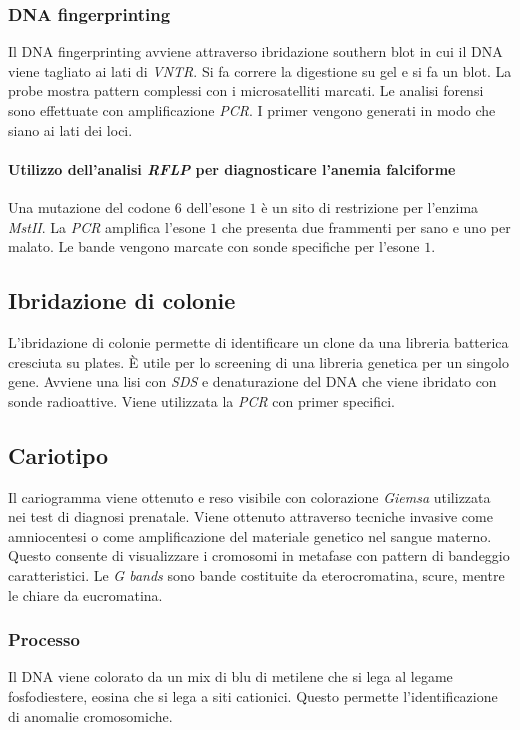 		\subsubsection{DNA fingerprinting}
		Il DNA fingerprinting avviene attraverso ibridazione southern blot in cui il DNA viene tagliato ai lati di \emph{VNTR}.
		Si fa correre la digestione su gel e si fa un blot.
		La probe mostra pattern complessi con i microsatelliti marcati.
		Le analisi forensi sono effettuate con amplificazione \emph{PCR}.
		I primer vengono generati in modo che siano ai lati dei loci.

			\paragraph{Utilizzo dell'analisi \emph{RFLP} per diagnosticare l'anemia falciforme}
			Una mutazione del codone $6$ dell'esone $1$ \`e un sito di restrizione per l'enzima \emph{MstII}.
			La \emph{PCR} amplifica l'esone $1$ che presenta due frammenti per sano e uno per malato.
			Le bande vengono marcate con sonde specifiche per l'esone $1$.

	\subsection{Ibridazione di colonie}
	L'ibridazione di colonie permette di identificare un clone da una libreria batterica cresciuta su plates.
	\`E utile per lo screening di una libreria genetica per un singolo gene.
	Avviene una lisi con \emph{SDS} e denaturazione del DNA che viene ibridato con sonde radioattive.
	Viene utilizzata la \emph{PCR} con primer specifici.

	\subsection{Cariotipo}
	Il cariogramma viene ottenuto e reso visibile con colorazione \emph{Giemsa} utilizzata nei test di diagnosi prenatale.
	Viene ottenuto attraverso tecniche invasive come amniocentesi o come amplificazione del materiale genetico nel sangue materno.
	Questo consente di visualizzare i cromosomi in metafase con pattern di bandeggio caratteristici.
	Le \emph{G bands} sono bande costituite da eterocromatina, scure, mentre le chiare da eucromatina.

		\subsubsection{Processo}
		Il DNA viene colorato da un mix di blu di metilene che si lega al legame fosfodiestere, eosina che si lega a siti cationici.
		Questo permette l'identificazione di anomalie cromosomiche.

